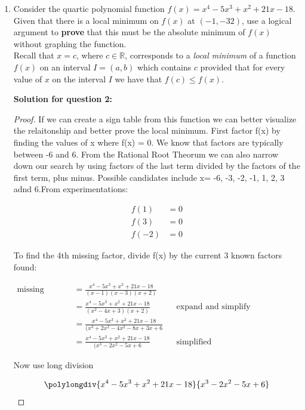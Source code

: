 \documentclass[12pt]{book}
\begin{document}
\begin{enumerate}
\newpage

\item Consider the quartic polynomial function $f(x) = x^4 - 5x^3 + x^2 + 21x - 18$. Given that there is a local minimum on $f(x)$ at $(-1,-32)$, use a logical argument to \textbf{prove} that this must be the absolute minimum of $f(x)$ without graphing the function. \\

Recall that $x=c$, where $c \in \mathbb{R}$, corresponds to a \emph{local minimum} of a function $f(x)$ on an interval $I = (a,b)$ which contains $c$ provided that for every value of $x$ on the interval $I$ we have that $f(c) \le f(x)$.

\vspace{0.3cm} 
\textbf{Solution for question 2:}\\
\begin{proof}
 If we can create a sign table from this function we can better visualize 
 the relaitonship and better prove the local minimum. First factor f(x) by 
 finding the values of x where f(x) = 0. We know that factors are typically between
 -6 and 6. From the Rational Root Theorum we can also narrow down our search by using
 factors of the last term divided by the factors of the first term, plus minus. Possible 
 candidates include x= -6, -3, -2, -1, 1, 2, 3 adnd 6.From experimentations:

 \vspace{-0.8cm}
 \begin{align*}
    f(1) &= 0 \\
    f(3) &= 0 \\
    f(-2) &= 0
 \end{align*}

To find the 4th missing factor, divide f(x) by the current 3 known factors found:

\begin{align*}
    \text{missing factor} &= \frac{x^4 - 5x^3 + x^2 + 21x - 18}{(x-1)(x-3)(x+2)} \\
    &= \frac{x^4 - 5x^3 + x^2 + 21x - 18}{(x^2-4x+3)(x+2)} && \text{expand and simplify denominator}\\
    &= \frac{x^4 - 5x^3 + x^2 + 21x - 18}{(x^3+2x^2-4x^2-8x+3x+6} \\
    &= \frac{x^4 - 5x^3 + x^2 + 21x - 18}{(x^3-2x^2-5x+6} && \text{simplified}
\end{align*}

\vspace{0.2cm}
\begin{center}
    Now use long division
\end{center}
\vspace{-0.5cm}
$$\polylongdiv{x^4 - 5x^3 + x^2 + 21x - 18}{x^3-2x^2-5x+6}$$


\end{proof}
\end{enumerate}
\end{document}
